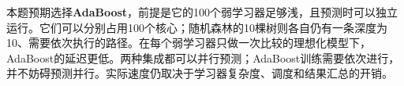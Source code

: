 本题预期选择\textbf{AdaBoost}，前提是它的100个弱学习器足够浅，且预测时可以独立运行。它们可以分别占用100个核心；随机森林的10棵树则各自仍有一条深度为10、需要依次执行的路径。在每个弱学习器只做一次比较的理想化模型下，AdaBoost的延迟更低。两种集成都可以并行预测；AdaBoost训练需要依次进行，并不妨碍预测并行。实际速度仍取决于学习器复杂度、调度和结果汇总的开销。
